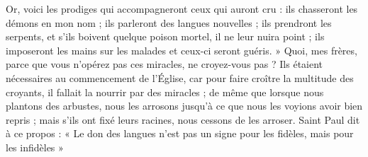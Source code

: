 Or, voici les prodiges qui accompagneront ceux qui auront cru : ils chasseront les démons en mon nom ; ils parleront des langues nouvelles ; ils prendront les serpents, et s’ils boivent quelque poison mortel, il ne leur nuira point ; ils imposeront les mains sur les malades et ceux-ci seront guéris. » Quoi, mes frères, parce que vous n’opérez pas ces miracles, ne croyez-vous pas ? Ils étaient nécessaires au commencement de l’Église, car pour faire croître la multitude des croyants, il fallait la nourrir par des miracles ; de même que lorsque nous plantons des arbustes, nous les arrosons jusqu’à ce que nous les voyions avoir bien repris ; mais s’ils ont fixé leurs racines, nous cessons de les arroser. Saint Paul dit à ce propos : « Le don des langues n’est pas un signe pour les fidèles, mais pour les infidèles »
